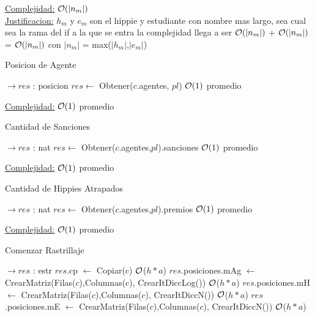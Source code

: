 \begin{Algoritmos}
\begin{algorithm}[H]
\underline{Complejidad:} $\mathcal{O}(|n_m|)$ \\
\underline{Justificacion:} $h_m$ y $e_m$ son el hippie y estudiante con nombre mas largo, sea cual sea la rama del if a la que se entra la complejidad llega a ser 
$\mathcal{O}(|n_m|)$ + $\mathcal{O}(|n_m|)$ = $\mathcal{O}(|n_m|)$ con $|n_m|$ = max($|h_m|$,$|e_m|$)
\end{algorithm}


\begin{algorithm}[H]
\caption{Posicion de Agente}
\begin{algorithmic}[1]
  $\to res$ : posicion
  \State $res \gets$ Obtener($c$.agentes, $pl$) \Comment $\mathcal{O}(1)$ promedio
 \EndProcedure
\end{algorithmic}

 \underline{Complejidad:} $\mathcal{O}(1)$ promedio
\end{algorithm}


\begin{algorithm}[H]
\caption{Cantidad de Sanciones}

\begin{algorithmic}[1]
 $\to res$ : nat
	\State $res \gets$ Obtener($c$.agentes,$pl$).sanciones \Comment $\mathcal{O}(1)$ promedio
\EndProcedure
\end{algorithmic}
\underline{Complejidad:} $\mathcal{O}(1)$ promedio
\end{algorithm}


\begin{algorithm}[H]
\caption{Cantidad de Hippies Atrapados}
\begin{algorithmic}[1]
 $\to res$ : nat
	\State $res \gets$ Obtener($c$.agentes,$pl$).premios \Comment $\mathcal{O}(1)$ promedio
\EndProcedure
\end{algorithmic}
\underline{Complejidad:} $\mathcal{O}(1)$ promedio
\end{algorithm}


\begin{algorithm}[H]
\caption{Comenzar Rastrillaje}

\begin{algorithmic}[1]
 $\to res$ : estr
	\State $res$.cp $\gets$ Copiar($c$) \Comment $\mathcal{O}$($h*a$)
	\State $res$.posiciones.mAg $\gets$ CrearMatriz(Filas($c$),Columnas($c$), CrearItDiccLog()) \Comment $\mathcal{O}$($h*a$)
	\State $res$.posiciones.mH $\gets$ CrearMatriz(Filas($c$),Columnas($c$), CrearItDiccN()) \Comment $\mathcal{O}$($h*a$)
	\State $res$.posiciones.mE $\gets$ CrearMatriz(Filas($c$),Columnas($c$), CrearItDiccN()) \Comment $\mathcal{O}$($h*a$)
	

\end{algorithmic}
\end{algorithm}
\end{Algoritmos}
